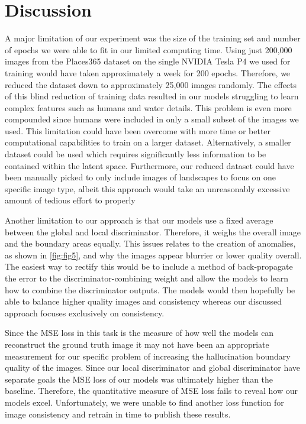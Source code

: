 \documentclass{article}
\begin{document}
\section{Discussion}
A major limitation of our experiment was the size of the training set and number of epochs we were able to fit in our limited computing time. Using just 200,000 images from the  Places365 dataset on the single NVIDIA Tesla P4 we used for training would have taken approximately a week for 200 epochs. Therefore, we reduced the dataset down to approximately 25,000 images randomly. The effects of this blind reduction of training data resulted in our models struggling to learn complex features such as humans and water details. This problem is even more compounded since humans were included in only a small subset of the images we used. This limitation could have been overcome with more time or better computational capabilities to train on a larger dataset. Alternatively, a smaller dataset could be used which requires significantly less information to be contained within the latent space. Furthermore, our reduced dataset could have been manually picked to only include images of landscapes to focus on one specific image type, albeit this approach would take an unreasonably excessive amount of tedious effort to properly 

Another limitation to our approach is that our models use a fixed average between the global and local discriminator. Therefore, it weighs the overall image and the boundary areas equally. This issues relates to the creation of anomalies, as shown in \ref{fig:fig5}, and why the images appear blurrier or lower quality overall. The easiest way to rectify this would be to include a method of back-propagate the error to the discriminator-combining weight and allow the models to learn how to combine the discriminator outputs. The models would then hopefully be able to balance higher quality images and consistency whereas our discussed approach focuses exclusively on consistency.

Since the MSE loss in this task is the measure of how well the models can reconstruct the ground truth image it may not have been an appropriate measurement for our specific problem of increasing the hallucination boundary quality of the images. Since our local discriminator and global discriminator have separate goals the MSE loss of our models was ultimately higher than the baseline. Therefore, the quantitative measure of MSE loss fails to reveal how our models excel. Unfortunately, we were unable to find another loss function for image consistency and retrain in time to publish these results.
\end{document}
